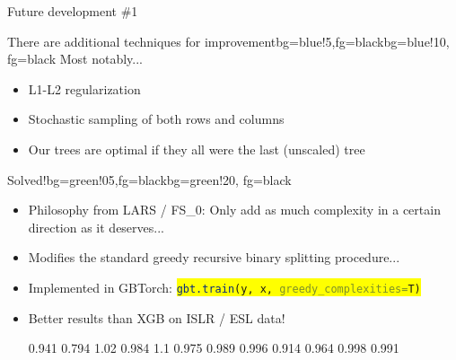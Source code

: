 \begin{frame}{Future development \#1}
	
	\small\begin{myblock}{There are additional techniques for improvement}{bg=blue!5,fg=black}{bg=blue!10, fg=black}
		Most notably...
		\begin{itemize}
			\item<1-> L1-L2 regularization
			\item<1-> Stochastic sampling of both rows and columns
			\item<1-> \colorbox{red!20}{Our trees are optimal if they all were the last (unscaled) tree}
		\end{itemize}
	\end{myblock}

	

	\begin{myblock}{Solved!}{bg=green!05,fg=black}{bg=green!20, fg=black}
		\begin{itemize}
		\item Philosophy from LARS / FS\_0: Only add as much complexity in a certain direction as it deserves...
		\item Modifies the standard greedy recursive binary splitting procedure...
		\item Implemented in GBTorch: \colorbox{yellow}{\lstinline[language=R]{gbt.train(y, x, greedy_complexities=T)}}
		\item Better results than XGB on ISLR / ESL data!
		
		0.941 0.794 1.02 0.984 1.1 0.975 0.989 0.996 0.914 0.964 0.998 0.991
	\end{itemize}

	\end{myblock}

\end{frame}

